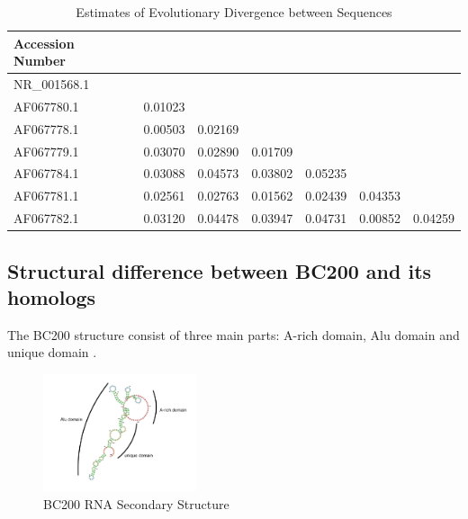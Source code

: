 \documentclass[conference, 11pt]{IEEEtran}
\begin{document}
\begin{table}[h]
  \centering
  \caption{Estimates of Evolutionary Divergence between Sequences}
  \label{tbl:distances}
  \begin{tabular}{lcccccc}
    \toprule
    Accession Number \\
    \midrule
    NR\_001568.1 \\
    AF067780.1 & 0.01023 \\
    AF067778.1 & 0.00503 & 0.02169 \\
    AF067779.1 & 0.03070 & 0.02890 & 0.01709 \\ 
    AF067784.1 & 0.03088 & 0.04573 & 0.03802 & 0.05235 \\
    AF067781.1 & 0.02561 & 0.02763 & 0.01562 & 0.02439 & 0.04353 \\ 
    AF067782.1 & 0.03120 & 0.04478 & 0.03947 & 0.04731 & 0.00852 & 0.04259 \\
    \bottomrule
  \end{tabular}
\end{table}

\subsection{Structural difference between BC200 and its homologs}\label{sec:results-structure}

The BC200 structure consist of three main parts: A-rich domain, Alu domain and unique domain \cite{jung2014rna}.

\begin{figure}[h]
  \centering
  \includegraphics[width=0.4\textwidth]{figs/rna-6.png}
  \caption{BC200 RNA Secondary Structure}
  \label{fig:bc200-structure}
\end{figure}
\end{document}

